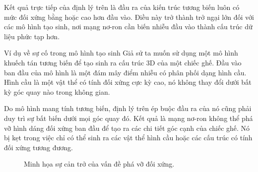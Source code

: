 Kết quả trực tiếp của định lý trên là đầu ra của kiến trúc tương biến luôn có mức đối xứng bằng hoặc cao hơn đầu vào. Điều này trở thành trở ngại lớn đối với các mô hình tạo sinh, nơi mạng nơ-ron cần biến nhiễu đầu vào thành cấu trúc dữ liệu phức tạp hơn.

\begin{examplebox}{Ví dụ về sự cố trong mô hình tạo sinh}
Giả sử ta muốn sử dụng một mô hình khuếch tán tương biến để tạo sinh ra cấu trúc 3D của một chiếc ghế. Đầu vào ban đầu của mô hình là một đám mây điểm nhiễu có phân phối dạng hình cầu. Hình cầu là một vật thể có tính đối xứng cực kỳ cao, nó không thay đổi dưới bất kỳ góc quay nào trong không gian. 

Do mô hình mang tính tương biến, định lý trên ép buộc đầu ra của nó cũng phải duy trì sự bất biến dưới mọi góc quay đó. Kết quả là mạng nơ-ron không thể phá vỡ hình dáng đối xứng ban đầu để tạo ra các chi tiết góc cạnh của chiếc ghế. Nó bị kẹt trong việc chỉ có thể sinh ra các vật thể hình cầu hoặc các cấu trúc có tính đối xứng tương đương.
\end{examplebox}

\begin{figure}[H]
    \centering
    \caption{Minh họa sự cản trở của vấn đề phá vỡ đối xứng.}
    \label{fig:symmetry-breaking}
\end{figure}

